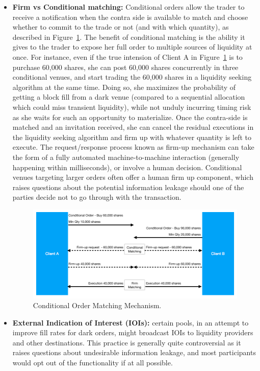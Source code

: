 \begin{itemize}
\item{\textbf{Firm vs Conditional matching:}} Conditional orders allow the trader to receive a notification when the contra side is available to match and choose whether to commit to the trade or not (and with which quantity), as described in Figure~\ref{fig:CondFlowChart2}. The benefit of conditional matching is the ability it gives to the trader to expose her full order to multiple sources of liquidity at once. For instance, even if the true intension of Client A in Figure~\ref{fig:CondFlowChart2} is to purchase 60,000 shares, she can post 60,000 shares concurrently in three conditional venues, and start trading the 60,000 shares in a liquidity seeking algorithm at the same time. Doing so, she maximizes the probability of getting a block fill from a dark venue (compared to a sequential allocation which could miss transient liquidity), while not unduly incurring timing risk as she waits for such an opportunity to materialize. Once the contra-side is matched and an invitation received, she can cancel the residual executions in the liquidity seeking algorithm and firm up with whatever quantity is left to execute.
The request/response process known as firm-up mechanism can take the form of a fully automated machine-to-machine interaction (generally happening within milliseconds), or involve a human decision. Conditional venues targeting larger orders often offer a human firm up component, which raises questions about the potential information leakage should one of the parties decide not to go through with the transaction. 

	\begin{figure}[!ht]
	\centering
	\includegraphics[width=\textwidth]{chapters/chapter_tech/figures/CondFlowChart2.png} 
	\caption{Conditional Order Matching Mechanism. \label{fig:CondFlowChart2}}
	\end{figure}

\item{\textbf{External Indication of Interest (IOIs):}} certain pools, in an attempt to improve fill rates for dark orders, might broadcast IOIs to liquidity providers and other destinations. This practice is generally quite controversial as it raises questions about undesirable information leakage, and most participants would opt out of the functionality if at all possible.

\end{itemize}

